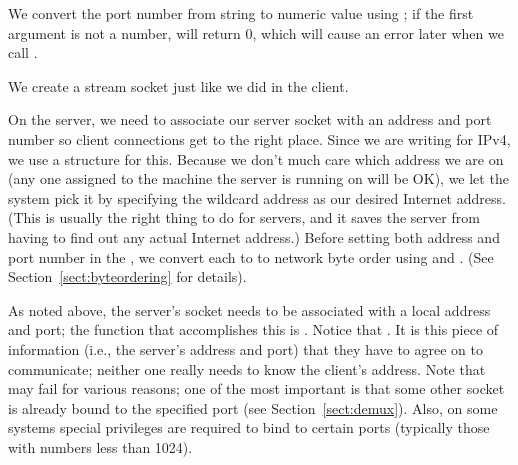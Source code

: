 
\begin{topcode}


We convert the port number from string to numeric value using
; if the first argument is not a number,  will
return 0, which will cause an error later when we call .


\begin{bottomcode}


We create a stream socket just like we did in the client.


On the server, we need to associate our server socket with an address
and port number so client connections get to the right place.
Since we are writing for IPv4, we use a 
structure for this.  Because we don't much care which address we are
on (any one assigned to the machine the
server is running on will be OK), we let the system pick it by
specifying the wildcard address  as our desired
Internet address.  (This is
usually the right thing to do for servers, and it saves the server from having
to find out any actual Internet address.)  Before setting both address
and port number in the , we
convert each to to network byte order using  and
.  (See Section~\ref{sect:byteordering} for details).


As noted above, the server's socket needs to be associated with a
local address and port; the function that accomplishes this
is .  Notice that . It is this 
piece of information (i.e., the server's address and port) that they
have to agree on to communicate; neither one really needs to know the
client's address.
%
Note that  may fail for
various reasons; one of the most important is that some other socket
is already bound to the specified port (see Section~\ref{sect:demux}).
Also, on some systems special privileges are required to bind to certain
ports (typically those with numbers less than 1024).


\end{bottomcode}
\end{topcode}
